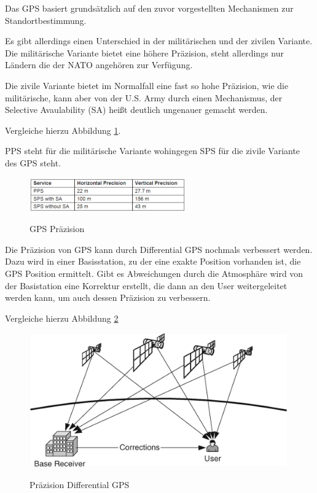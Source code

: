 Das GPS basiert grundsätzlich auf den zuvor vorgestellten Mechanismen zur Standortbestimmung. 

Es gibt allerdings einen Unterschied in der militärischen und der zivilen Variante. Die militärische Variante bietet eine höhere Präzision, steht allerdings nur Ländern die der NATO angehören zur Verfügung. 

Die zivile Variante bietet im Normalfall eine fast so hohe Präzision, wie die militärische, kann aber von der U.S. Army durch einen Mechanismus, der Selective Avaulability (SA) heißt deutlich ungenauer gemacht werden.

Vergleiche hierzu Abbildung \ref{fig:GPS Praezision}.

PPS steht für die militärische Variante wohingegen SPS für die zivile Variante des GPS steht.

\begin{figure}[h]
\centering
\includegraphics[width=0.6\textwidth]{ref/images/GPS_Praezision.PNG}
\caption[GPS Präzision]{GPS Präzision}
\label{fig:GPS Praezision}
\cite[S. 195]{Schiller2004}
\end{figure}

Die Präzision von GPS kann durch Differential GPS nochmals verbessert werden. Dazu wird in einer Basisstation, zu der eine exakte Position vorhanden ist, die GPS Position ermittelt. Gibt es Abweichungen durch die Atmosphäre wird von der Basistation eine Korrektur erstellt, die dann an den User weitergeleitet werden kann, um auch dessen Präzision zu verbessern.

Vergleiche hierzu Abbildung \ref{fig:DGPS}
\begin{figure}[h]
\centering
\includegraphics[width=0.99\textwidth]{ref/images/DGPS.PNG}
\caption[Präzision Differential GPS]{Präzision Differential GPS}
\label{fig:DGPS}
\cite[S. 196]{Schiller2004}
\end{figure}

